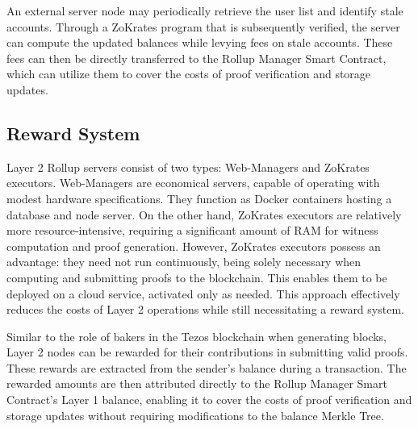 An external server node may periodically retrieve the user list and identify stale accounts. Through a ZoKrates program that is subsequently verified, the server can compute the updated balances while levying fees on stale accounts. These fees can then be directly transferred to the Rollup Manager Smart Contract, which can utilize them to cover the costs of proof verification and storage updates.

\subsection{Reward System}

Layer 2 Rollup servers consist of two types: Web-Managers and ZoKrates executors. Web-Managers are economical servers, capable of operating with modest hardware specifications. They function as Docker containers hosting a database and node server. On the other hand, ZoKrates executors are relatively more resource-intensive, requiring a significant amount of RAM for witness computation and proof generation. However, ZoKrates executors possess an advantage: they need not run continuously, being solely necessary when computing and submitting proofs to the blockchain. This enables them to be deployed on a cloud service, activated only as needed. This approach effectively reduces the costs of Layer 2 operations while still necessitating a reward system.

Similar to the role of bakers in the Tezos blockchain when generating blocks, Layer 2 nodes can be rewarded for their contributions in submitting valid proofs. These rewards are extracted from the sender's balance during a transaction. The rewarded amounts are then attributed directly to the Rollup Manager Smart Contract's Layer 1 balance, enabling it to cover the costs of proof verification and storage updates without requiring modifications to the balance Merkle Tree.